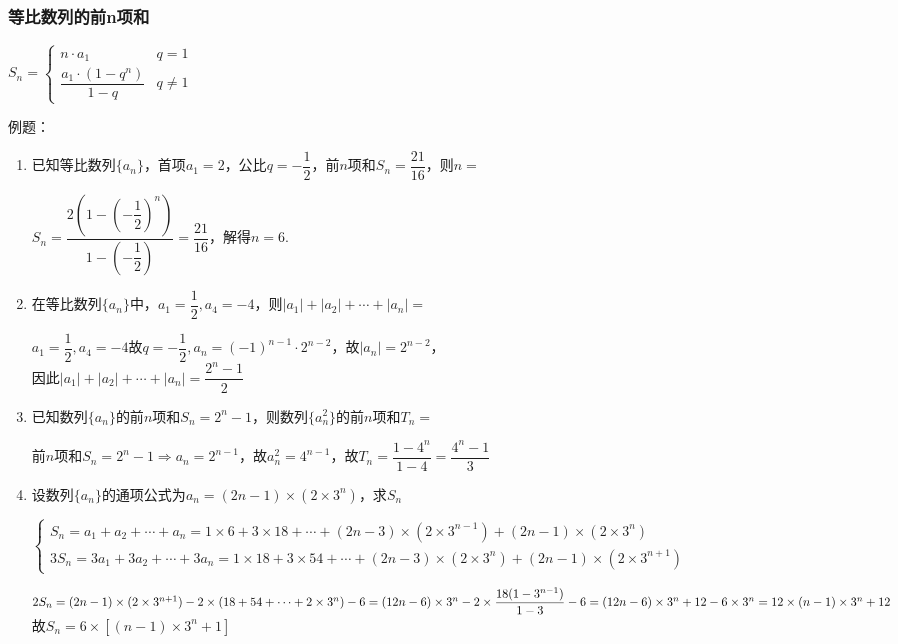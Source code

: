\subsubsection*{等比数列的前n项和}
$S_n = \left \{\begin{array}{ll}
    n \cdot a_1 & q = 1 \\
    \dfrac{a_1 \cdot (1-q^n)}{1-q} & q \neq 1
\end{array} \right. $

例题：
\begin{enumerate}
    \item 已知等比数列$\{a_n\}$，首项$a_1 = 2$，公比$q = -\dfrac{1}{2}$，前$n$项和$S_n = \dfrac{21}{16}$，则$n = $
    \begin{jieda}
        $S_n = \dfrac{2\left(1-\left(-\dfrac{1}{2}\right)^n\right)}{1 - \left(-\dfrac{1}{2}\right)} = \dfrac{21}{16}$，解得$n = 6$.
    \end{jieda}
    \item 在等比数列$\{a_n\}$中，$a_1 = \dfrac{1}{2}, a_4 = -4$，则$|a_1| + |a_2| + \cdots + |a_n| = $
    \begin{jieda}
        $a_1 = \dfrac{1}{2}, a_4 = -4$故$q = -\dfrac{1}{2}, a_n = (-1)^{n-1} \cdot 2^{n-2}$，故$|a_n| = 2^{n-2}$，\\
        因此$|a_1| + |a_2| + \cdots + |a_n| = \dfrac{2^n-1}{2}$
    \end{jieda}
    \item 已知数列$\{a_n\}$的前$n$项和$S_n = 2^n - 1$，则数列$\{a_n^2\}$的前$n$项和$T_n = $
    \begin{jieda}
        前$n$项和$S_n = 2^n - 1 \Rightarrow a_n = 2^{n-1}$，故$a_n^2 = 4^{n-1}$，故$T_n = \dfrac{1-4^n}{1-4} = \dfrac{4^n - 1}{3}$
    \end{jieda}
    \item 设数列$\{a_n\}$的通项公式为$a_n = (2n-1)\times(2\times3^n)$，求$S_n$
    \begin{jieda}
    
        $\left\{\begin{array}{l}
             S_n = a_1 + a_2 + \cdots + a_n = 1 \times 6 + 3 \times 18 + \cdots + (2n-3)\times(2\times3^{n-1}) + (2n-1)\times(2\times3^n)  \\
             3S_n = 3a_1 + 3a_2 + \cdots + 3a_n = 1 \times 18 + 3 \times 54 + \cdots + (2n-3)\times(2\times3^{n}) + (2n-1)\times(2\times3^{n+1})
        \end{array}\right.$
        
        $2S_n = (2n-1)\times(2\times3^{n+1}) - 2 \times (18 + 54 + \cdots + 2\times3^n) - 6 \\
        = (12n-6) \times 3^n - 2 \times \dfrac{18(1-3^{n-1})}{1-3} - 6 \\
        = (12n-6) \times 3^n + 12 - 6 \times 3^n \\
        = 12 \times (n-1) \times 3^n +12$ \\
        故$S_n = 6 \times [(n-1) \times 3^n + 1]$
    \end{jieda} 
\end{enumerate}

